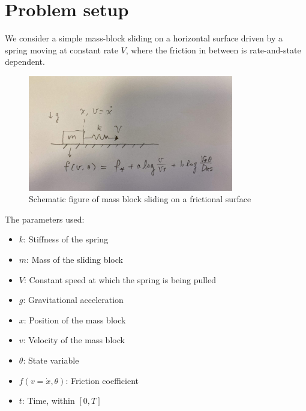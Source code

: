 \newif\ifshowsolutions
\showsolutionsfalse


\newcommand{\la}{\left\langle}
\newcommand{\ra}{\right\rangle}
\newcommand{\indep}{\raisebox{0.05em}{\rotatebox[origin=c]{90}{$\models$}}}

\pagestyle{fancy}
\section{Problem setup}
We consider a simple mass-block sliding on a horizontal surface driven by a spring moving at constant rate $V$, 
where the friction in between is rate-and-state dependent. 

\begin{figure}[H]
    \centering
    \includegraphics[width=0.8\textwidth]{shit1.png}
    \caption{Schematic figure of mass block sliding on a frictional surface}
    \label{fig:massBlockSliding}
\end{figure}

The parameters used: 
\begin{itemize}
    \item $k$: Stiffness of the spring
    \item $m$: Mass of the sliding block
    \item $V$: Constant speed at which the spring is being pulled
    \item $g$: Gravitational acceleration
    \item $x$: Position of the mass block
    \item $v$: Velocity of the mass block
    \item $\theta$: State variable
    \item $f(v=\dot{x}, \theta)$: Friction coefficient
    \item $t$: Time, within $[0, T]$
\end{itemize}

